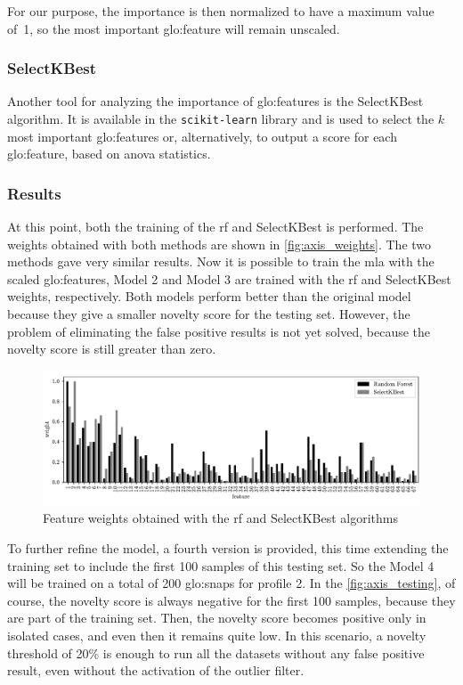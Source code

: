 For our purpose, the importance is then normalized to have a maximum value of~1, so the most important \gls{glo:feature} will remain unscaled.

\subsubsection{SelectKBest}
Another tool for analyzing the importance of \gls{glo:feature}s is the SelectKBest algorithm. It is available in the \texttt{scikit-learn} library and is used to select the $k$ most important \gls{glo:feature}s or, alternatively, to output a score for each \gls{glo:feature}, based on \gls{anova} statistics.

\subsubsection{Results}
At this point, both the training of the \gls{rf} and SelectKBest is performed. The weights obtained with both methods are shown in \autoref{fig:axis_weights}. The two methods gave very similar results. Now it is possible to train the \gls{mla} with the scaled \gls{glo:feature}s, Model 2 and Model 3 are trained with the \gls{rf} and SelectKBest weights, respectively. Both models perform better than the original model because they give a smaller novelty score for the testing set. However, the problem of eliminating the false positive results is not yet solved, because the novelty score is still greater than zero.

\begin{figure}
    \centering
    \includegraphics[width=\textwidth]{images/LinearMotor/Feat_weights.pdf}
    \caption{Feature weights obtained with the \gls{rf} and SelectKBest algorithms}
    \label{fig:axis_weights}
\end{figure}

To further refine the model, a fourth version is provided, this time extending the training set to include the first 100 samples of this testing set. So the Model 4 will be trained on a total of 200 \gls{glo:snap}s for profile 2. In the \autoref{fig:axis_testing}, of course, the novelty score is always negative for the first 100 samples, because they are part of the training set. Then, the novelty score becomes positive only in isolated cases, and even then it remains quite low. In this scenario, a novelty threshold of 20\% is enough to run all the datasets without any false positive result, even without the activation of the outlier filter.

